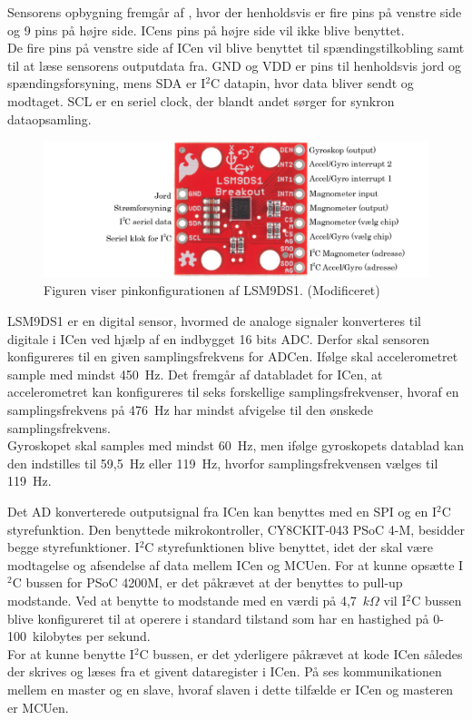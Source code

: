 Sensorens opbygning fremgår af , hvor der henholdsvis er fire pins på venstre side og 9 pins på højre side. ICens pins på højre side vil ikke blive benyttet.\\
De fire pins på venstre side af ICen vil blive benyttet til spændingstilkobling samt til at læse sensorens outputdata fra. GND og VDD er pins til henholdsvis jord og spændingsforsyning, mens SDA er I$^2$C datapin, hvor data bliver sendt og modtaget. SCL er en seriel clock, der blandt andet sørger for synkron dataopsamling.
\begin{figure}[H]
	\centering
	\includegraphics[scale=0.3]{figures/cDesign/accelerometeret.png}
	\caption{Figuren viser pinkonfigurationen af LSM9DS1. \citep{Jimb02016} (Modificeret)}
	\label{fig:IC_pins}
\end{figure}

LSM9DS1 er en digital sensor, hvormed de analoge signaler konverteres til digitale i ICen ved hjælp af en indbygget 16 bits ADC. Derfor skal sensoren konfigureres til en given samplingsfrekvens for ADCen. Ifølge  skal accelerometret sample med mindst 450~Hz. Det fremgår af databladet for ICen, at accelerometret kan konfigureres til seks forskellige samplingsfrekvenser, hvoraf en samplingsfrekvens på 476~Hz har mindst afvigelse til den ønskede samplingsfrekvens. \\
Gyroskopet skal samples med mindst 60~Hz, men ifølge gyroskopets datablad kan den indstilles til 59,5~Hz eller 119~Hz, hvorfor samplingsfrekvensen vælges til 119~Hz.

Det AD konverterede outputsignal fra ICen kan benyttes med en SPI og en I$^{2}$C styrefunktion. Den benyttede mikrokontroller, CY8CKIT-043 PSoC 4-M, besidder begge styrefunktioner. I$^{2}$C styrefunktionen blive benyttet, idet der skal være modtagelse og afsendelse af data mellem ICen og MCUen. For at kunne opsætte I$^{2}$C bussen for PSoC 4200M, er det påkrævet at der benyttes to pull-up modstande. Ved at benytte to modstande med en værdi på 4,7~$k\Omega$ vil I$^{2}$C bussen blive konfigureret til at operere i standard tilstand som har en hastighed på 0-100~kilobytes per sekund. \citep{CYPRESS2016} \\
For at kunne benytte I$^{2}$C bussen, er det yderligere påkrævet at kode ICen således der skrives og læses fra et givent dataregister i ICen. På  ses kommunikationen mellem en master og en slave, hvoraf slaven i dette tilfælde er ICen og masteren er MCUen. 

